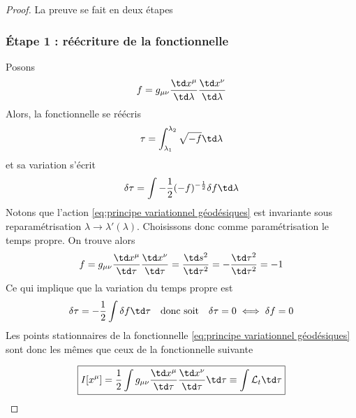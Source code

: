 \begin{proof} La preuve se fait en deux étapes
    \subsubsection{Étape 1 : réécriture de la fonctionnelle}
    Posons
    \begin{equation}
        f = g_{\mu \nu}\frac{\td x^{\mu}}{\td \lambda}\frac{\td x^{\nu}}{\td \lambda}
    \end{equation}
    Alors, la fonctionnelle se réécris
    \begin{equation}
        \tau =\int^{\lambda_2}_{\lambda_1}\sqrt{-f}\td\lambda
    \end{equation}
    et sa variation s'écrit
    \begin{equation}
        \delta \tau = \int -\frac{1}{2}(-f)^{-\frac{1}{2}}\delta f \td \lambda
    \end{equation}
    Notons que l'action \ref{eq:principe variationnel géodésiques} est invariante sous reparamétrisation $\lambda \rightarrow \lambda'(\lambda)$. Choisissons donc comme paramétrisation le temps propre. On trouve alors
    \begin{equation}
        f = g_{\mu \nu}\frac{\td x^{\mu}}{\td \tau}\frac{\td x^{\nu}}{\td \tau}= \frac{\td s^2}{\td \tau ^2}= -\frac{\td \tau^2}{\td \tau ^2} = -1
    \end{equation}
    Ce qui implique que la variation du temps propre est 
    \begin{equation}
        \delta \tau = -\frac{1}{2}\int \delta f \td\tau \quad \text{donc soit} \quad \delta \tau = 0 \iff \delta f=0
    \end{equation}
    Les points stationnaires de la fonctionnelle \ref{eq:principe variationnel géodésiques} sont donc les mêmes que ceux de la fonctionnelle suivante 

    \begin{equation}
        \boxed{I[x^\mu] = \frac{1}{2}\int g_{\mu \nu} \frac{\td x^{\mu}}{\td \tau}\frac{\td x^{\nu}}{\td \tau} \td \tau \equiv \int \mathcal{L}_t \td \tau}
        \label{eq:action I}
    \end{equation}

\end{proof}
